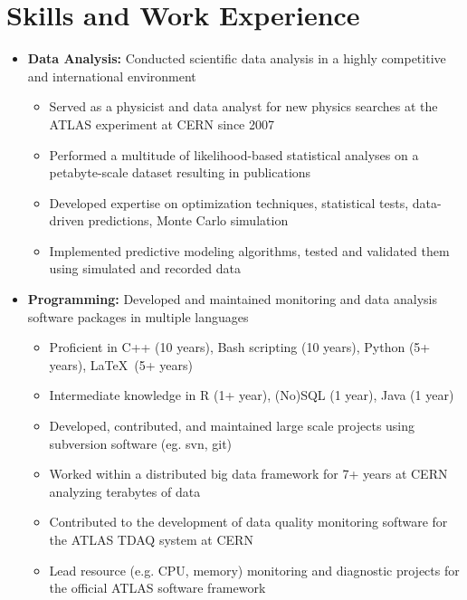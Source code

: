 \documentclass{myfancycv}
\begin{document}
\makeheader

\section{Skills and Work Experience}
\begin{itemize}

\item {\textbf{Data Analysis:} Conducted scientific data analysis in a highly competitive and international environment
{\begin{itemize}\setlength\itemindent{-2.2em}
	 \item Served as a physicist and data analyst for new physics searches at the ATLAS experiment at CERN since 2007
	 \item Performed a multitude of likelihood-based statistical analyses on a petabyte-scale dataset resulting in publications
	 \item Developed expertise on optimization techniques, statistical tests, data-driven predictions, Monte Carlo simulation
	 \item Implemented predictive modeling algorithms, tested and validated them using simulated and recorded data
\end{itemize}}%
}

\vspace{6pt}

\item {\textbf{Programming:} Developed and maintained monitoring and data analysis software packages in multiple languages
{\begin{itemize}\setlength\itemindent{-2.2em}
	\item Proficient in C++ (10 years), Bash scripting (10 years), Python (5+ years), \LaTeX\ (5+ years)
	\item Intermediate knowledge in R (1+ year), (No)SQL (1 year), Java (1 year)
	\item Developed, contributed, and maintained large scale projects using subversion software (eg. svn, git)
	\item Worked within a distributed big data framework for 7+ years at CERN analyzing terabytes of data
	\item Contributed to the development of data quality monitoring software for the ATLAS TDAQ system at CERN
	\item Lead resource (e.g. CPU, memory) monitoring and diagnostic projects for the official ATLAS software framework
\end{itemize}}%
}


\end{itemize}
\end{document}

